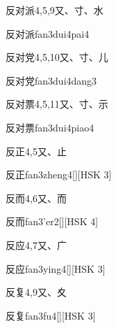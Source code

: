 \begin{entry}{反对派}{4,5,9}{⼜、⼨、⽔}
  \begin{phonetics}{反对派}{fan3dui4pai4}
  \end{phonetics}
\end{entry}

\begin{entry}{反对党}{4,5,10}{⼜、⼨、⼉}
  \begin{phonetics}{反对党}{fan3dui4dang3}
  \end{phonetics}
\end{entry}

\begin{entry}{反对票}{4,5,11}{⼜、⼨、⽰}
  \begin{phonetics}{反对票}{fan3dui4piao4}
  \end{phonetics}
\end{entry}

\begin{entry}{反正}{4,5}{⼜、⽌}
  \begin{phonetics}{反正}{fan3zheng4}[][HSK 3]
  \end{phonetics}
\end{entry}

\begin{entry}{反而}{4,6}{⼜、⽽}
  \begin{phonetics}{反而}{fan3'er2}[][HSK 4]
  \end{phonetics}
\end{entry}

\begin{entry}{反应}{4,7}{⼜、⼴}
  \begin{phonetics}{反应}{fan3ying4}[][HSK 3]
  \end{phonetics}
\end{entry}

\begin{entry}{反复}{4,9}{⼜、⼢}
  \begin{phonetics}{反复}{fan3fu4}[][HSK 3]
  \end{phonetics}
\end{entry}


